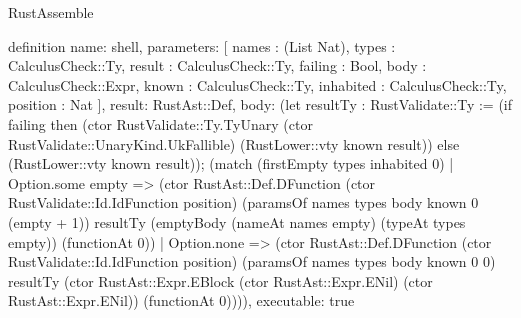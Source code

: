 \begin{lexlean}{RustAssemble}
\begin{semanticmodule}
definition{
  name: shell,
  parameters: [
    names : (List Nat),
    types : CalculusCheck::Ty,
    result : CalculusCheck::Ty,
    failing : Bool,
    body : CalculusCheck::Expr,
    known : CalculusCheck::Ty,
    inhabited : CalculusCheck::Ty,
    position : Nat
  ],
  result: RustAst::Def,
  body: (let resultTy : RustValidate::Ty := (if failing then (ctor RustValidate::Ty.TyUnary (ctor RustValidate::UnaryKind.UkFallible) (RustLower::vty known result)) else (RustLower::vty known result)); (match (firstEmpty types inhabited 0)
    | Option.some empty => (ctor RustAst::Def.DFunction (ctor RustValidate::Id.IdFunction position) (paramsOf names types body known 0 (empty + 1)) resultTy (emptyBody (nameAt names empty) (typeAt types empty)) (functionAt 0))
    | Option.none => (ctor RustAst::Def.DFunction (ctor RustValidate::Id.IdFunction position) (paramsOf names types body known 0 0) resultTy (ctor RustAst::Expr.EBlock (ctor RustAst::Expr.ENil) (ctor RustAst::Expr.ENil)) (functionAt 0)))),
  executable: true
}


\end{semanticmodule}
\end{lexlean}
